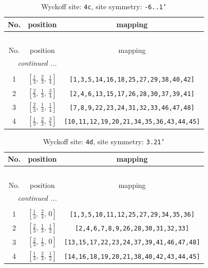 \documentclass[fleqn,8pt]{jsarticle}
\begin{document}
\renewcommand{\arraystretch}{1.2}
\begin{longtable}{ccc}
\caption{Wyckoff site: {\tt 4c}, site symmetry: {\tt -6..1'}}
 \\
 \hline \hline
No. & position & mapping \\ \hline \endfirsthead

\multicolumn{2}{l}{\tablename\ \thetable{}} \\
 \hline \hline
No. & position & mapping \\ \hline \endhead

 \hline \hline
\multicolumn{2}{r}{\footnotesize\it continued ...} \\ \endfoot

 \hline \hline
\multicolumn{2}{r}{} \\ \endlastfoot

1 & $\left[ \frac{1}{3},\, \frac{2}{3},\, \frac{1}{4} \right]$ & {\tt [1,3,5,14,16,18,25,27,29,38,40,42]} \\ \hline
2 & $\left[ \frac{2}{3},\, \frac{1}{3},\, \frac{3}{4} \right]$ & {\tt [2,4,6,13,15,17,26,28,30,37,39,41]} \\ \hline
3 & $\left[ \frac{2}{3},\, \frac{1}{3},\, \frac{1}{4} \right]$ & {\tt [7,8,9,22,23,24,31,32,33,46,47,48]} \\ \hline
4 & $\left[ \frac{1}{3},\, \frac{2}{3},\, \frac{3}{4} \right]$ & {\tt [10,11,12,19,20,21,34,35,36,43,44,45]} \\
\end{longtable}
\renewcommand{\arraystretch}{1.2}
\begin{longtable}{ccc}
\caption{Wyckoff site: {\tt 4d}, site symmetry: {\tt 3.21'}}
 \\
 \hline \hline
No. & position & mapping \\ \hline \endfirsthead

\multicolumn{2}{l}{\tablename\ \thetable{}} \\
 \hline \hline
No. & position & mapping \\ \hline \endhead

 \hline \hline
\multicolumn{2}{r}{\footnotesize\it continued ...} \\ \endfoot

 \hline \hline
\multicolumn{2}{r}{} \\ \endlastfoot

1 & $\left[ \frac{1}{3},\, \frac{2}{3},\, 0 \right]$ & {\tt [1,3,5,10,11,12,25,27,29,34,35,36]} \\ \hline
2 & $\left[ \frac{2}{3},\, \frac{1}{3},\, \frac{1}{2} \right]$ & {\tt [2,4,6,7,8,9,26,28,30,31,32,33]} \\ \hline
3 & $\left[ \frac{2}{3},\, \frac{1}{3},\, 0 \right]$ & {\tt [13,15,17,22,23,24,37,39,41,46,47,48]} \\ \hline
4 & $\left[ \frac{1}{3},\, \frac{2}{3},\, \frac{1}{2} \right]$ & {\tt [14,16,18,19,20,21,38,40,42,43,44,45]} \\
\end{longtable}
\end{document}
